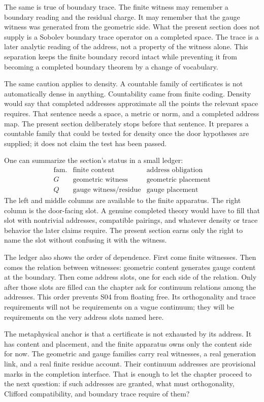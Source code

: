 The same is true of boundary trace. The finite witness may remember a boundary
reading and the residual charge. It may remember that the gauge witness was
generated from the geometric side. What the present section does not supply is
a Sobolev boundary trace operator on a completed space. The trace is a later
analytic reading of the address, not a property of the witness alone. This
separation keeps the finite boundary record intact while preventing it from
becoming a completed boundary theorem by a change of vocabulary.

The same caution applies to density. A countable family of certificates is not
automatically dense in anything. Countability came from finite coding. Density
would say that completed addresses approximate all the points the relevant
space requires. That sentence needs a space, a metric or norm, and a completed
address map. The present section deliberately stops before that sentence. It
prepares a countable family that could be tested for density once the door
hypotheses are supplied; it does not claim the test has been passed.

One can summarize the section's status in a small ledger:
\[
  \begin{array}{c|c|c}
  \text{fam.} & \text{finite content} & \text{address obligation} \\
  \hline
  G & \text{geometric witness} & \text{geometric placement} \\
  Q & \text{gauge witness/residue} & \text{gauge placement}
  \end{array}
\]
The left and middle columns are available to the finite apparatus. The right
column is the door-facing slot. A genuine completed theory would have to fill
that slot with nontrivial addresses, compatible pairings, and whatever density
or trace behavior the later claims require. The present section earns only the
right to name the slot without confusing it with the witness.

The ledger also shows the order of dependence. First come finite witnesses.
Then comes the relation between witnesses: geometric content generates gauge
content at the boundary. Then come address slots, one for each side of the
relation. Only after those slots are filled can the chapter ask for continuum
relations among the addresses. This order prevents S04 from floating free. Its
orthogonality and trace requirements will not be requirements on a vague
continuum; they will be requirements on the very address slots named here.

The metaphysical anchor is that a certificate is not exhausted by its address.
It has content and placement, and the finite apparatus owns only the content
side for now. The geometric and gauge families carry real witnesses, a real
generation link, and a real finite residue account. Their continuum addresses
are provisional marks in the completion interface. That is enough to let the
chapter proceed to the next question: if such addresses are granted, what must
orthogonality, Clifford compatibility, and boundary trace require of them?


